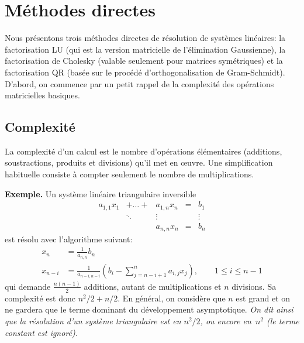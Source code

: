 







\clearpage

\section{Méthodes directes}

Nous présentons trois méthodes directes de résolution de systèmes linéaires:
la factorisation LU (qui est la version matricielle de l'élimination
Gaussienne), la factorisation de Cholesky (valable seulement pour matrices
symétriques) et la factorisation QR (basée sur le procédé d'orthogonalisation
de Gram-Schmidt).  D'abord, on commence par un petit rappel de la complexité
des opérations matricielles basiques.

\subsection{Complexité}

La complexité d'un calcul est le nombre d'opérations élémentaires (additions,
soustractions,  produits et divisions) qu'il met en œuvre.  Une
simplification habituelle consiste à compter seulement le nombre de
multiplications.

{\bf Exemple.}
Un système linéaire triangulaire inversible
\[
\begin{array}{ccccc}
a_{1,1}x_1  & + \ldots +  & a_{1,n}x_n & = & b_1 \\
& \ddots & \vdots && \vdots \\
&& a_{n,n}x_n & =&  b_n
\end{array}
\]
est résolu avec l'algorithme suivant:
\begin{align*}
x_n & = \frac{1}{a_{n,n}}b_n \\
x_{n-i} & = \frac{1}{a_{n-i,n-i}}\left(
b_i - \sum_{j=n-i+1}^{n} a_{i,j}x_j
\right), \qquad 1 \leq i \leq n-1
\end{align*}
qui demande $\frac{n(n-1)}{2}$ additions, autant de multiplications et $n$
divisions. Sa complexité est donc ${n^2}/{2} + n/2$. En général, on considère
que $n$ est grand et on ne gardera que le terme dominant du développement
asymptotique.
\emph{On dit ainsi que la résolution d'un système triangulaire est en
$n^2/2$, ou encore en~$n^2$ (le terme constant est ignoré).}

